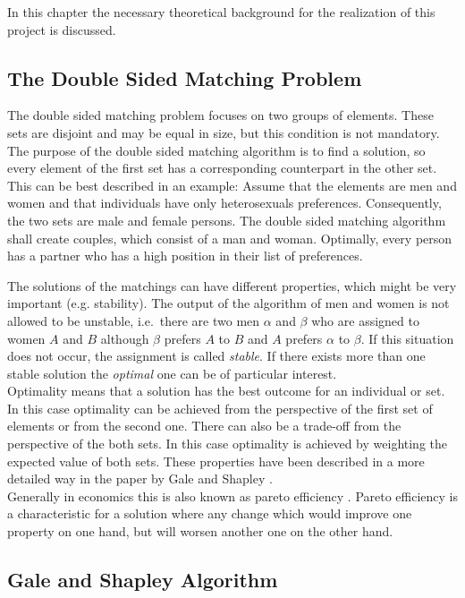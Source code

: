 \label{theory}
In this chapter the necessary theoretical background for the realization of this project is discussed.

\subsection{The Double Sided Matching Problem}
The double sided matching problem focuses on two groups of elements.
These sets are disjoint and may be equal in size, but this condition is not mandatory.
The purpose of the double sided matching algorithm is to find a solution, so every element of the first set has a corresponding counterpart in the other set. 
This can be best described in an example:
Assume that the elements are men and women and that individuals have only heterosexuals preferences.
Consequently, the two sets are male and female persons.
The double sided matching algorithm shall create couples, which consist of a man and woman.
Optimally, every person has a partner who has a high position in their list of preferences.

The solutions of the matchings can have different properties, which might be very important (e.g. stability).
The output of the algorithm of men and women is not allowed to be unstable, i.e.\ there are two men $\alpha$ and $\beta$ who are assigned to women $A$ and $B$ although $\beta$ prefers $A$ to $B$ and $A$ prefers $\alpha$ to $\beta$.
If this situation does not occur, the assignment is called \textit{stable}.
If there exists more than one stable solution the \textit{optimal} one can be of particular interest.\\ 
Optimality means that a solution has the best outcome for an individual or set.
In this case optimality can be achieved from the perspective of the first set of elements or from the second one.
There can also be a trade-off from the perspective of the both sets. 
In this case optimality is achieved by weighting the expected value of both sets.
These properties have been described in a more detailed way in the paper by Gale and Shapley \cite{gale62a}.\\
Generally in economics this is also known as pareto efficiency \cite[p. 46]{9780199297818}. 
Pareto efficiency is a characteristic for a solution where any change which would improve one property on one hand, but will worsen another one on the other hand.


\subsection{Gale and Shapley Algorithm}

